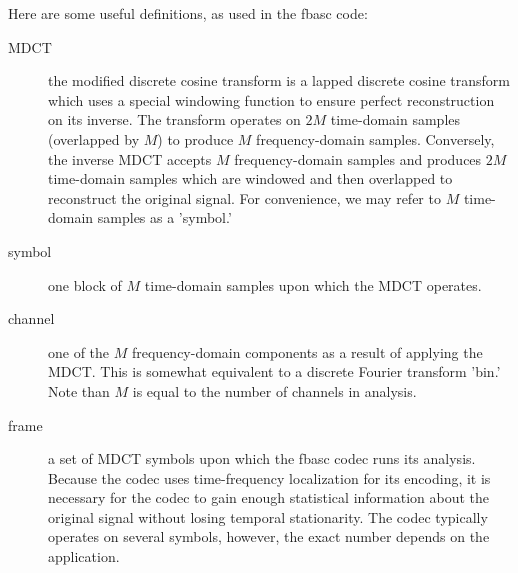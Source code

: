 Here are some useful definitions, as used in the fbasc code:

\begin{description}
\item[MDCT]
the modified discrete cosine transform is a lapped discrete cosine
transform which uses a special windowing function to ensure perfect
reconstruction on its inverse. The transform operates on $2M$ time-domain
samples (overlapped by $M$) to produce $M$ frequency-domain samples.
Conversely, the inverse MDCT accepts $M$ frequency-domain samples and
produces $2M$ time-domain samples which are windowed and then overlapped to
reconstruct the original signal.  For convenience, we may refer to $M$
time-domain samples as a 'symbol.'

\item[symbol]
one block of $M$ time-domain samples upon which the MDCT operates.
 
\item[channel]
one of the $M$ frequency-domain components as a result of applying the
MDCT.  This is somewhat equivalent to a discrete Fourier transform 'bin.'
Note than $M$ is equal to the number of channels in analysis.

\item[frame]
a set of MDCT symbols upon which the fbasc codec runs its analysis.
Because the codec uses time-frequency localization for its encoding, it is
necessary for the codec to gain enough statistical information about the
original signal without losing temporal stationarity. The codec typically
operates on several symbols, however, the exact number depends on the
application.
\end{description}


